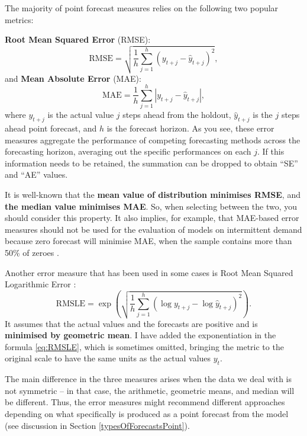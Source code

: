 \documentclass[
]{book}
\theoremstyle{definition}
\theoremstyle{definition}
\theoremstyle{definition}
\theoremstyle{definition}
\theoremstyle{remark}
\begin{document}
The majority of point forecast measures relies on the following two popular metrics:

\textbf{Root Mean Squared Error} (RMSE):
\begin{equation}
    \mathrm{RMSE} = \sqrt{\frac{1}{h} \sum_{j=1}^h \left( y_{t+j} -\hat{y}_{t+j} \right)^2 },
    \label{eq:RMSE}
\end{equation}
and \textbf{Mean Absolute Error} (MAE):
\begin{equation}
    \mathrm{MAE} = \frac{1}{h} \sum_{j=1}^h \left| y_{t+j} -\hat{y}_{t+j} \right| ,
    \label{eq:MAE}
\end{equation}
where \(y_{t+j}\) is the actual value \(j\) steps ahead from the holdout, \(\hat{y}_{t+j}\) is the \(j\) steps ahead point forecast, and \(h\) is the forecast horizon. As you see, these error measures aggregate the performance of competing forecasting methods across the forecasting horizon, averaging out the specific performances on each \(j\). If this information needs to be retained, the summation can be dropped to obtain ``SE'' and ``AE'' values.

It is well-known \citep[see, for example,][]{Kolassa2016} that the \textbf{mean value of distribution minimises RMSE}, and \textbf{the median value minimises MAE}. So, when selecting between the two, you should consider this property. It also implies, for example, that MAE-based error measures should not be used for the evaluation of models on intermittent demand because zero forecast will minimise MAE, when the sample contains more than 50\% of zeroes \citep[see, for example,][]{Wallstrom2010}.

Another error measure that has been used in some cases is Root Mean Squared Logarithmic Error \citep[RMSLE, see discussion in][]{Tofallis2015}:
\begin{equation}
    \mathrm{RMSLE} = \exp\left(\sqrt{\frac{1}{h} \sum_{j=1}^h \left( \log y_{t+j} -\log \hat{y}_{t+j} \right)^2} \right).
    \label{eq:RMSLE}
\end{equation}
It assumes that the actual values and the forecasts are positive and is \textbf{minimised by geometric mean}. I have added the exponentiation in the formula \eqref{eq:RMSLE}, which is sometimes omitted, bringing the metric to the original scale to have the same units as the actual values \(y_t\).

The main difference in the three measures arises when the data we deal with is not symmetric -- in that case, the arithmetic, geometric means, and median will be different. Thus, the error measures might recommend different approaches depending on what specifically is produced as a point forecast from the model (see discussion in Section \ref{typesOfForecastsPoint}).
\end{document}
